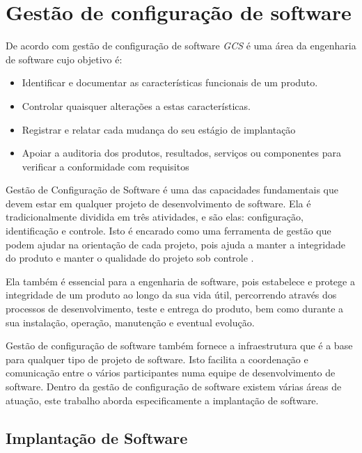 \chapter{Gestão de configuração de software}
\label{cap-referencial}

De acordo com  gestão de configuração de software \textit{GCS} 
é uma área da engenharia de software cujo objetivo é:

\begin{itemize}
  \item Identificar e documentar as características funcionais de
  um produto.
  \item Controlar quaisquer alterações a estas características.
  \item Registrar e relatar cada mudança do seu estágio de implantação
  \item Apoiar a auditoria dos produtos, resultados, serviços ou
componentes para verificar a conformidade com requisitos

\end{itemize}

Gestão de Configuração de Software é uma das capacidades fundamentais que devem
estar em qualquer projeto de desenvolvimento de software. Ela é
tradicionalmente dividida em três atividades, e são elas: configuração,
identificação e controle. Isto é encarado como uma ferramenta de
gestão que podem ajudar na orientação de cada projeto, pois ajuda a manter a
integridade do produto e manter o qualidade do projeto sob controle \cite{gcs}. 

Ela também é essencial para a engenharia de software, pois estabelece e protege a
integridade de um produto ao longo da sua vida útil, percorrendo através dos
processos de desenvolvimento, teste e entrega do produto, bem como
durante a sua instalação, operação, manutenção e eventual evolução\cite{ieegcs}.

Gestão de configuração de software também fornece a infraestrutura que é a base para
qualquer tipo de projeto de software. Isto facilita a coordenação e comunicação
entre o vários participantes numa equipe de desenvolvimento de software.
Dentro da gestão de configuração de software
existem várias áreas de atuação, este trabalho aborda especificamente a 
implantação de software\cite{gcs}.

\section{Implantação de Software}

